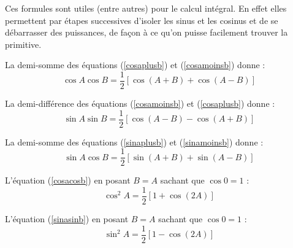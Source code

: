 ﻿Ces formules sont utiles (entre autres) pour le calcul intégral. En effet elles permettent par étapes successives d'isoler les sinus et les cosinus et de se débarrasser des puissances, de façon à ce qu'on puisse facilement trouver la primitive.

La demi-somme des équations (\ref{cosaplusb}) et (\ref{cosamoinsb}) donne :
\begin{equation}
\cos{A}\cos{B} = \frac{1}{2}[\cos(A+B)+\cos(A-B)]
\label{cosacosb}
\end{equation}

La demi-différence des équations (\ref{cosamoinsb}) et (\ref{cosaplusb}) donne :
\begin{equation}
\sin{A}\sin{B} = \frac{1}{2}[\cos(A-B)-\cos(A+B)]
\label{sinasinb}
\end{equation}

La demi-somme des équations (\ref{sinaplusb}) et (\ref{sinamoinsb}) donne :
\begin{equation}
\sin{A}\cos{B} = \frac{1}{2}[\sin(A+B) + \sin(A-B)]
\label{sinacosb}
\end{equation}

L'équation (\ref{cosacosb}) en posant $B=A$ sachant que $\cos 0 = 1$ :
\begin{equation}
\cos^2{A} = \frac{1}{2}[1+\cos(2A)]
\end{equation}

L'équation (\ref{sinasinb}) en posant $B=A$ sachant que $\cos 0 = 1$ :
\begin{equation}
\sin^2{A} = \frac{1}{2}[1-\cos(2A)]
\end{equation}